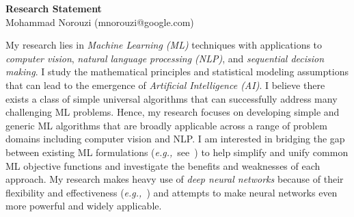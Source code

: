 \documentclass[a4paper, 10pt]{article}
\def\eg{{\em e.g.,}}
\begin{document}
\thispagestyle{fancy}
\lhead{}
\rhead{}
\renewcommand{\headrulewidth}{0pt} 
\renewcommand{\footrulewidth}{0pt} 
\fancyfoot[C]{\footnotesize \textcolor{gray}{https://norouzi.github.io/}} 


\pagestyle{fancy}
\lhead{\textcolor{gray}{\it Mohammad Norouzi}}
\rhead{\textcolor{gray}{\thepage/\totalpages{}}}


\begin{center}
{\LARGE \bf Research Statement}\\
\vspace*{0.1cm}
{\normalsize Mohammad Norouzi (mnorouzi@google.com)}
\vspace*{0.2cm}
\end{center}




My research lies in {\em Machine Learning (ML)} techniques with
applications to {\em computer vision}, {\em natural language
  processing (NLP)}, and {\em sequential decision making}. I study the
mathematical principles and statistical modeling assumptions that can
lead to the emergence of {\em Artificial Intelligence (AI)}.  I
believe there exists a class of simple universal algorithms that
can successfully address many challenging ML problems. Hence, my
research focuses on developing simple and generic ML algorithms that
are broadly applicable across a range of problem domains including
computer vision and NLP. I am interested in bridging the gap between
existing ML formulations (\eg~see~\cite{raml,pcl}) to help simplify
and unify common ML objective functions and investigate the benefits
and weaknesses of each approach. My research makes heavy use of {\em
  deep neural networks} because of their flexibility and effectiveness
(\eg~\cite{seq2seq,alphago}) and attempts to make neural networks even
more powerful and widely applicable.
\end{document}
